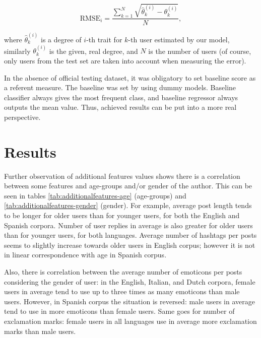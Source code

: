 \documentclass[10pt, a4paper]{article}
\begin{document}
\[\mathrm{RMSE}_i=\frac{\sum_{k = 1}^{N}\sqrt{\hat{\theta}_{k}^{(i)} - \theta_{k}^{(i)}}}{N},\]

\noindent where $\hat{\theta}_k^{(i)}$ is a degree of $i$-th trait for $k$-th user estimated by our model, similarly $\theta_k^{(i)}$ is the given, real degree, and $N$ is the number of users (of course, only users from the test set are taken into account when measuring the error).

In the absence of official testing dataset, it was obligatory to set baseline score as a referent measure.
The baseline was set by using dummy models.
Baseline classifier always gives the most frequent class, and baseline regressor always outputs the mean value.
Thus, achieved results can be put into a more real perspective.

\section{Results}
\label{sec:results}

Further observation of additional features values shows there is a correlation between some features and age-groups and/or gender of the author.
This can be seen in tables \ref{tab:additionalfeatures-age} (age-groups) and \ref{tab:additionalfeatures-gender} (gender).
For example, average post length tends to be longer for older users than for younger users, for both the English and Spanish corpora.
Number of user replies in average is also greater for older users than for younger users, for both languages.
Average number of hashtags per posts seems to slightly increase towards older users in English corpus; however it is not in linear correspondence with age in Spanish corpus.

Also, there is correlation between the average number of emoticons per posts considering the gender of user: in the English, Italian, and Dutch corpora, female users in average tend to use up to three times as many emoticons than male users.
However, in Spanish corpus the situation is reversed: male users in average tend to use in more emoticons than female users.
Same goes for number of exclamation marks: female users in all languages use in average more exclamation marks than male users.

\end{document}
